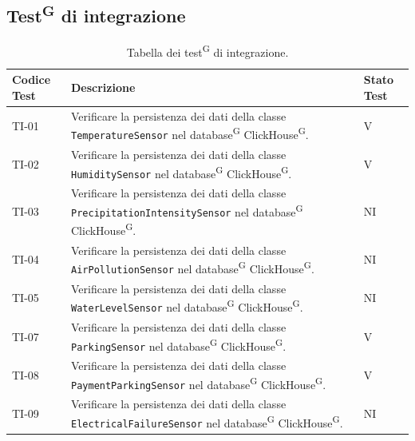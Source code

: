 \documentclass[8pt]{article}
\newcommand{\glossterm}[1]{#1\textsuperscript{G}} %
\begin{document}
\subsection{\glossterm{Test} di integrazione}\label{sec:test integrazione}
\renewcommand{\arraystretch}{2.5}
\begin{longtable}{|>{\centering}p{2cm}|>{\RaggedRight}m{12cm}|>{\centering\arraybackslash}p{2cm}|}
    \hline
    \rowcolor{white}
    \textbf{Codice Test} & \textbf{Descrizione} & \textbf{Stato Test} \\
    \hline
    \endfirsthead 
    \rowcolor{white}
    \caption{Tabella dei \glossterm{test} di integrazione.} 
    \label{table:Tabella dei test di integrazione}
    \endlastfoot 
        
    TI-01 & Verificare la persistenza dei dati della classe \verb|TemperatureSensor| nel \glossterm{database} \glossterm{ClickHouse}.  & V \\
    \hline

    TI-02 & Verificare la persistenza dei dati della classe \verb|HumiditySensor| nel \glossterm{database} \glossterm{ClickHouse}.  & V \\
    \hline
    
    TI-03 & Verificare la persistenza dei dati della classe \verb|PrecipitationIntensitySensor| nel \glossterm{database} \glossterm{ClickHouse}. & NI \\
    \hline

    TI-04 & Verificare la persistenza dei dati della classe \verb|AirPollutionSensor| nel \glossterm{database} \glossterm{ClickHouse}. & NI \\
    \hline

    TI-05 & Verificare la persistenza dei dati della classe \verb|WaterLevelSensor| nel \glossterm{database} \glossterm{ClickHouse}. & NI \\
    \hline

    TI-07 & Verificare la persistenza dei dati della classe \verb|ParkingSensor| nel \glossterm{database} \glossterm{ClickHouse}. & V \\
    \hline 

    TI-08 & Verificare la persistenza dei dati della classe \verb|PaymentParkingSensor| nel \glossterm{database} \glossterm{ClickHouse}. & V \\
    \hline
    
    TI-09 & Verificare la persistenza dei dati della classe \verb|ElectricalFailureSensor| nel \glossterm{database} \glossterm{ClickHouse}. & NI \\
    \hline


\end{longtable}
\end{document}
